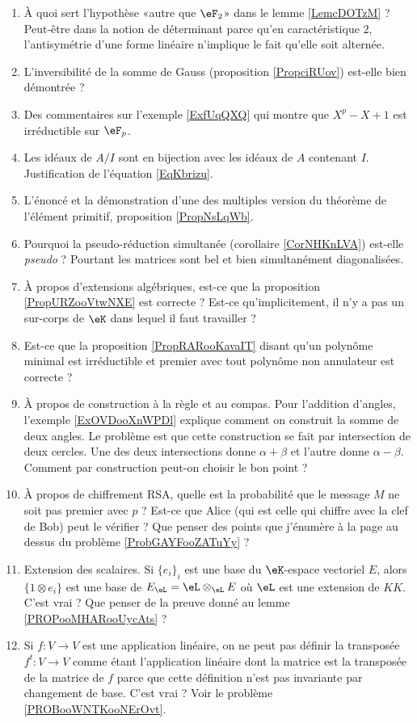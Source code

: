 \begin{enumerate}
    \item
        À quoi sert l'hypothèse «autre que \( \eF_2\)» dans le lemme \ref{LemcDOTzM} ? Peut-être dans la notion de déterminant parce qu'en caractéristique \( 2\), l'antisymétrie d'une forme linéaire n'implique le fait qu'elle soit alternée.
    \item
        L'inversibilité de la somme de Gauss (proposition \ref{PropciRUov}) est-elle bien démontrée ?
    \item
        Des commentaires sur l'exemple \ref{ExfUqQXQ} qui montre que \( X^p-X+1\) est irréductible sur \( \eF_p\).
    \item
        Les idéaux de \( A/I\) sont en bijection avec les idéaux de \( A\) contenant \( I\). Justification de l'équation \eqref{EqKbrizu}.
    \item
        L'énoncé et la démonstration d'une des multiples version du théorème de l'élément primitif, proposition \ref{PropNsLqWb}.
    \item
        Pourquoi la pseudo-réduction simultanée (corollaire \ref{CorNHKnLVA}) est-elle \emph{pseudo} ? Pourtant les matrices sont bel et bien simultanément diagonalisées.
    \item
        À propos d'extensions algébriques, est-ce que la proposition \ref{PropURZooVtwNXE} est correcte ? Est-ce qu'implicitement, il n'y a pas un sur-corps de \( \eK\) dans lequel il faut travailler ?
    \item
        Est-ce que la proposition \ref{PropRARooKavaIT} disant qu'un polynôme minimal est irréductible et premier avec tout polynôme non annulateur est correcte ?
    \item
        À propos de construction à la règle et au compas. Pour l'addition d'angles, l'exemple \ref{ExOVDooXnWPDl} explique comment on construit la somme de deux angles. Le problème est que cette construction se fait par intersection de deux cercles. Une des deux intersections donne \( \alpha+\beta\) et l'autre donne \( \alpha-\beta\). Comment par construction peut-on choisir le bon point ?
    \item
        À propos de chiffrement RSA, quelle est la probabilité que le message \( M\) ne soit pas premier avec \( p\) ? Est-ce que Alice (qui est celle qui chiffre avec la clef de Bob) peut le vérifier ? Que penser des points que j'énumère à la page \pageref{PageAKTBooMDeQxY} au dessus du problème \ref{ProbGAYFooZATuYy} ?
    \item
        Extension des scalaires. Si \( \{ e_i \}_i\) est une base du \( \eK\)-espace vectoriel \( E\), alors \( \{ 1\otimes e_i \}\) est une base de \( E_{\eL}=\eL\otimes_{\eL}E\) où \( \eL\) est une extension de \( KK\). C'est vrai ? Que penser de la preuve donné au lemme \ref{PROPooMHARooUycAts} ?
    \item
        Si \( f\colon V\to V\) est une application linéaire, on ne peut pas définir la transposée \( f^t\colon V\to V\) comme étant l'application linéaire dont la matrice est la transposée de la matrice de \( f\) parce que cette définition n'est pas invariante par changement de base. C'est vrai ? Voir le problème \ref{PROBooWNTKooNErOvt}.
\end{enumerate}

